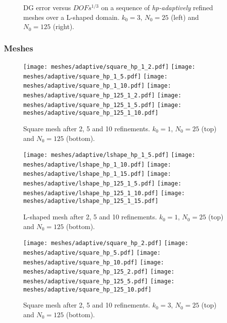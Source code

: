\begin{figure}[!ht]
    \begin{subfigure}[b]{0.45\textwidth}
		
	\end{subfigure}
	\hfill
	\begin{subfigure}[b]{0.45\textwidth}
		
	\end{subfigure}
    \caption{DG error versus $DOFs^{1/3}$ on a sequence of \textit{hp-adaptively} refined meshes over a L-shaped domain. $k_0 = 3$, $N_0 = 25$ (left) and $N_0 = 125$ (right).}
\end{figure}

\newpage
\subsubsection{Meshes}

\begin{figure}[!ht]
	\centering
    \texttt{[image: meshes/adaptive/square\_hp\_1\_2.pdf]}
	\texttt{[image: meshes/adaptive/square\_hp\_1\_5.pdf]}
	\texttt{[image: meshes/adaptive/square\_hp\_1\_10.pdf]}
    \texttt{[image: meshes/adaptive/square\_hp\_125\_1\_2.pdf]}
	\texttt{[image: meshes/adaptive/square\_hp\_125\_1\_5.pdf]}
	\texttt{[image: meshes/adaptive/square\_hp\_125\_1\_10.pdf]}
	\caption{Square mesh after 2, 5 and 10 refinements. $k_0 = 1$, $N_0 = 25$ (top) and $N_0 = 125$ (bottom).}
\end{figure}

\begin{figure}[!ht]
	\centering
	\texttt{[image: meshes/adaptive/lshape\_hp\_1\_5.pdf]}
	\texttt{[image: meshes/adaptive/lshape\_hp\_1\_10.pdf]}
	\texttt{[image: meshes/adaptive/lshape\_hp\_1\_15.pdf]}
    \texttt{[image: meshes/adaptive/lshape\_hp\_125\_1\_5.pdf]}
	\texttt{[image: meshes/adaptive/lshape\_hp\_125\_1\_10.pdf]}
	\texttt{[image: meshes/adaptive/lshape\_hp\_125\_1\_15.pdf]}
	\caption{L-shaped mesh after 2, 5 and 10 refinements. $k_0 = 1$, $N_0 = 25$ (top) and $N_0 = 125$ (bottom).}
\end{figure}

\newpage

\begin{figure}[!ht]
	\centering
    \texttt{[image: meshes/adaptive/square\_hp\_2.pdf]}
	\texttt{[image: meshes/adaptive/square\_hp\_5.pdf]}
	\texttt{[image: meshes/adaptive/square\_hp\_10.pdf]}
    \texttt{[image: meshes/adaptive/square\_hp\_125\_2.pdf]}
	\texttt{[image: meshes/adaptive/square\_hp\_125\_5.pdf]}
	\texttt{[image: meshes/adaptive/square\_hp\_125\_10.pdf]}
	\caption{Square mesh after 2, 5 and 10 refinements. $k_0 = 3$, $N_0 = 25$ (top) and $N_0 = 125$ (bottom).}
\end{figure}

